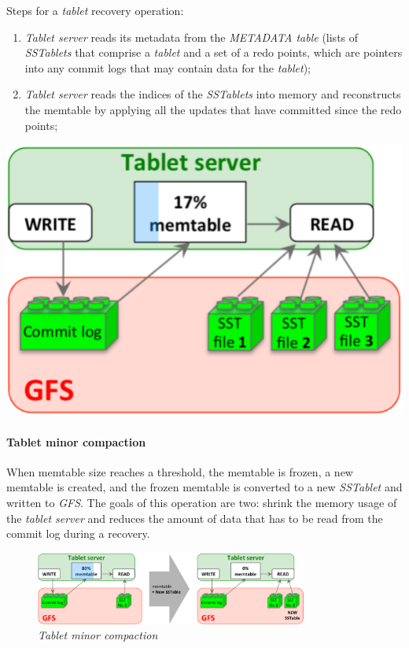 \bigskip\noindent\begin{minipage}[c]{0.65\textwidth}
    Steps for a \emph{tablet} recovery operation:
    \begin{enumerate}
        \item \emph{Tablet server} reads its metadata from the \emph{METADATA
        table} (lists of \emph{SSTablets} that comprise a \emph{tablet} and        a set of a redo points, which are
        pointers into any commit logs that may contain data for the \emph{tablet});
        \item \emph{Tablet server} reads the indices of the \emph{SSTablets}
        into memory and reconstructs the memtable by applying all the updates
        that have committed since the redo points;
    \end{enumerate}
\end{minipage}\hfill
\begin{minipage}[c]{0.33\textwidth}
    \includegraphics[width=\textwidth]{images/gbt-tablet-recovery.png}
\end{minipage}

\paragraph{Tablet minor compaction}
When memtable size reaches a threshold, the memtable is frozen, a new memtable
is created, and the frozen memtable is converted to a new \emph{SSTablet} and
written to \emph{GFS}. The goals of this operation are two: shrink the memory
usage of the \emph{tablet server} and reduces the amount of data that has to be
read from the commit log during a recovery.

\begin{figure}[h!]
    \centering
    \includegraphics[width=0.8\textwidth]{images/gbt-tablet-minor-comp.png}
    \caption{\emph{Tablet minor compaction}}
\end{figure}

